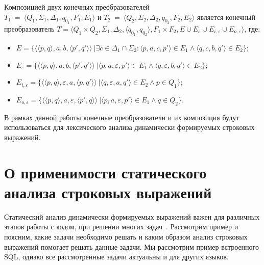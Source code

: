 \begin{mydef}

Композицией двух конечных преобразователей \\  $T_1~=~\langle Q_1, \Sigma_1, \Delta_1, q_{0_{1}}, F_1, E_1 \rangle$ и $T_2~=~\langle Q_2, \Sigma_2, \Delta_2, q_{0_{2}}, F_2, E_2 \rangle$ является конечный преобразователь $T =\langle Q_1  \times Q_2, \Sigma_1, \Delta_2, \langle q_{0_{1}}, q_{0_{2}} \rangle, F_1 \times F_2, E \cup E_{\varepsilon} \cup E_{i,\varepsilon} \cup E_{o,\varepsilon} \rangle$, где: 

\begin{itemize}
\item $E = \{ \langle \langle p, q \rangle, a, b, \langle p', q' \rangle \rangle\ | \exists c \in \Delta_1 \cap \Sigma_2 : \langle p, a, c, p' \rangle \in E_1 \wedge \langle q, c, b, q' \rangle \in E_2\}$;
\item $E_{\varepsilon} = \{ \langle \langle p, q \rangle, a, b, \langle p', q' \rangle \rangle\ | \langle p, a, {\varepsilon}, p' \rangle \in E_1 \wedge \langle q, {\varepsilon}, b, q' \rangle \in E_2\}$;
\item $E_{i, \varepsilon} = \{ \langle \langle p, q \rangle, {\varepsilon}, a, \langle p, q' \rangle \rangle\ | \langle q, {\varepsilon}, a, q' \rangle \in E_2 \wedge p \in Q_1 \} $;
\item $E_{o, \varepsilon} = \{ \langle \langle p, q \rangle,  a, {\varepsilon}, \langle p', q \rangle \rangle\ | \langle p, a, {\varepsilon}, p' \rangle \in E_1 \wedge q \in Q_2 \}. $
\end{itemize}
\end{mydef}

В рамках данной работы конечные преобразователи и их композиция будут использоваться для лексического анализа динамически формируемых строковых выражений.

\section{О применимости статического анализа строковых выражений}

Статический анализ динамически формируемых выражений важен для различных этапов работы с кодом, при решении многих задач~\cite{DevelopmentDSQLTools}. Рассмотрим пример и поясним, какие задачи необходимо решать и каким образом анализ строковых выражений помогает решать данные задачи. Мы рассмотрим пример встроенного SQL, однако все рассмотренные задачи актуальны и для других языков.

